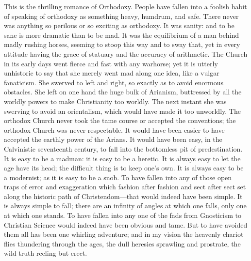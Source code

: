 This is the thrilling romance of Orthodoxy. People have fallen into a foolish habit of speaking of orthodoxy as something heavy, humdrum, and safe. There never was anything so perilous or so exciting as orthodoxy. It was sanity: and to be sane is more dramatic than to be mad. It was the equilibrium of a man behind madly rushing horses, seeming to stoop this way and to sway that, yet in every attitude having the grace of statuary and the accuracy of arithmetic. The Church in its early days went fierce and fast with any warhorse; yet it is utterly unhistoric to say that she merely went mad along one idea, like a vulgar fanaticism. She swerved to left and right, so exactly as to avoid enormous obstacles. She left on one hand the huge bulk of Arianism, buttressed by all the worldly powers to make Christianity too worldly. The next instant she was swerving to avoid an orientalism, which would have made it too unworldly. The orthodox Church never took the tame course or accepted the conventions; the orthodox Church was never respectable. It would have been easier to have accepted the earthly power of the Arians. It would have been easy, in the Calvinistic seventeenth century, to fall into the bottomless pit of predestination. It is easy to be a madman: it is easy to be a heretic. It is always easy to let the age have its head; the difficult thing is to keep one’s own. It is always easy to be a modernist; as it is easy to be a snob. To have fallen into any of those open traps of error and exaggeration which fashion after fashion and sect after sect set along the historic path of Christendom—that would indeed have been simple. It is always simple to fall; there are an infinity of angles at which one falls, only one at which one stands. To have fallen into any one of the fads from Gnosticism to Christian Science would indeed have been obvious and tame. But to have avoided them all has been one whirling adventure; and in my vision the heavenly chariot flies thundering through the ages, the dull heresies sprawling and prostrate, the wild truth reeling but erect.


